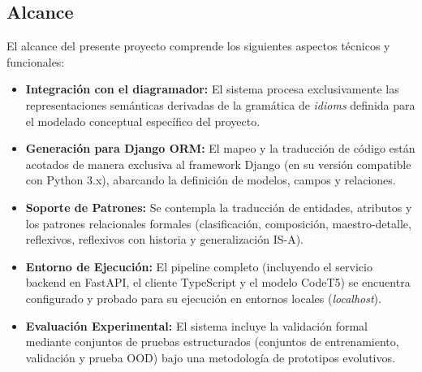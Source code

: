 \subsection{Alcance}
El alcance del presente proyecto comprende los siguientes aspectos técnicos y funcionales:
\begin{itemize}
    \item \textbf{Integración con el diagramador:} El sistema procesa exclusivamente las representaciones semánticas derivadas de la gramática de \textit{idioms} definida para el modelado conceptual específico del proyecto.
    \item \textbf{Generación para Django ORM:} El mapeo y la traducción de código están acotados de manera exclusiva al framework Django (en su versión compatible con Python 3.x), abarcando la definición de modelos, campos y relaciones.
    \item \textbf{Soporte de Patrones:} Se contempla la traducción de entidades, atributos y los patrones relacionales formales (clasificación, composición, maestro-detalle, reflexivos, reflexivos con historia y generalización IS-A).
    \item \textbf{Entorno de Ejecución:} El pipeline completo (incluyendo el servicio backend en FastAPI, el cliente TypeScript y el modelo CodeT5) se encuentra configurado y probado para su ejecución en entornos locales (\textit{localhost}).
    \item \textbf{Evaluación Experimental:} El sistema incluye la validación formal mediante conjuntos de pruebas estructurados (conjuntos de entrenamiento, validación y prueba OOD) bajo una metodología de prototipos evolutivos.
\end{itemize}

